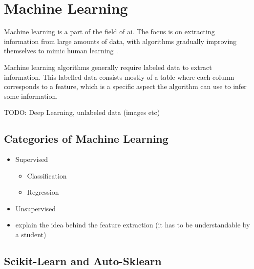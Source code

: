 \section{Machine Learning}\label{sec:machine_learning}
Machine learning is a part of the field of \ac{ai}. The focus is on extracting information from large amounts of data, with algorithms gradually improving themselves to mimic human learning~\cite{what-is-ml}.

Machine learning algorithms generally require labeled data to extract information. This labelled data consists mostly of a table where each column corresponds to a feature, which is a specific aspect the algorithm can use to infer some information. %

TODO\@: Deep Learning, unlabeled data (images etc)
\subsection{Categories of Machine Learning}
\begin{itemize}
  \item Supervised
        \begin{itemize}
          \item Classification
          \item Regression
        \end{itemize}
  \item Unsupervised
  \item explain the idea behind the feature extraction (it has to be understandable by a student)
\end{itemize}

\subsection{Scikit-Learn and Auto-Sklearn}\label{sec:ml-libraries}
